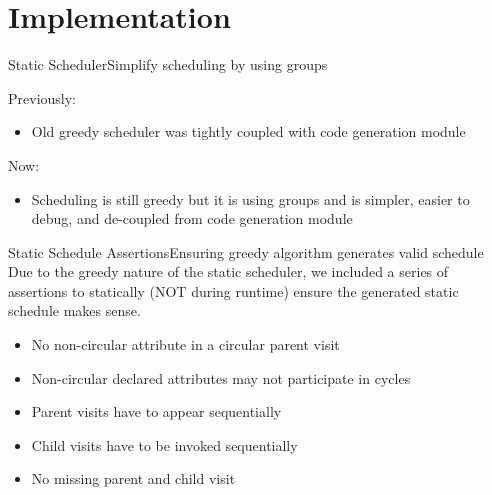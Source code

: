 \section{Implementation}


\begin{frame}{Static Scheduler}{Simplify scheduling by using groups}

Previously:
\begin{itemize}
    \item Old greedy scheduler was \alert{tightly coupled with code generation} module
\end{itemize}
    
Now:
\begin{itemize}
    \item Scheduling is still greedy but it is using groups and is simpler, easier to debug, and \alert{de-coupled from code generation} module
\end{itemize}

\end{frame}






\begin{frame}{Static Schedule Assertions}{Ensuring greedy algorithm generates valid schedule}
    Due to the \alert{greedy nature of the static scheduler}, we included a series of \alert{assertions} to \alert{statically} (NOT during runtime) ensure the generated static schedule makes sense.

\newlinevspace
    
    \begin{itemize}
        \item No non-circular attribute in a circular parent visit
        \item Non-circular declared attributes may not participate in cycles
        \item Parent visits have to appear sequentially
        \item Child visits have to be invoked sequentially
        \item No missing parent and child visit
    \end{itemize}
\end{frame}

